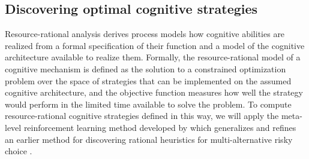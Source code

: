 \subsection{Discovering optimal cognitive strategies}
Resource-rational analysis \cite{GriffithsLiederGoodman2015} derives process models how cognitive abilities are realized from a formal specification of their function and a model of the cognitive architecture available to realize them. Formally, the resource-rational model of a cognitive mechanism is defined as the solution to a constrained optimization problem over the space of strategies that can be implemented on the assumed cognitive architecture, and the objective function measures how well the strategy would perform in the limited time available to solve the problem. To compute resource-rational cognitive strategies defined in this way, we will apply the meta-level reinforcement learning method developed by \cite{LiederCallawayGulKruegerGriffiths2017} which generalizes and refines an earlier method for discovering rational heuristics for multi-alternative risky choice \citep{LiederKruegerGriffiths2017}. 

